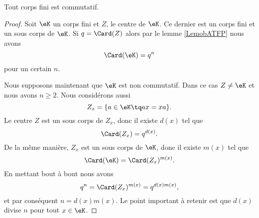 \begin{theorem}    \label{ThoMncIWA}
    Tout corps fini est commutatif.
\end{theorem}

\begin{proof}
    Soit \( \eK\) un corps fini et \( Z\), le centre de \( \eK\). Ce dernier est un corps fini et un sous corps de \( \eK\). Si \( q=\Card(Z)\) alors par le lemme \ref{LemobATFP} nous avons
    \begin{equation}
        \Card(\eK)=q^n
    \end{equation}
    pour un certain \( n\).

    Nous supposons maintenant que \( \eK\) est non commutatif. Dans ce cas \( Z\neq \eK\) et nous avons \( n\geq 2\). Nous considérons aussi
    \begin{equation}
        Z_x=\{ a\in \eK\tq ax=xa \}.
    \end{equation}
    Le centre \( Z\) est un sous corps de \( Z_x\), donc il existe \( d(x)\) tel  que
    \begin{equation}
        \Card(Z_x)=q^{d(x)}.
    \end{equation}
    De la même manière, \( Z_x\) est un sous corps de \( \eK\), donc il existe \( m(x)\) tel que
    \begin{equation}
        \Card(\eK)=\Card(Z_x)^{m(x)}.
    \end{equation}
    En mettant bout à bout nous avons
    \begin{equation}
        q^n=\Card(Z_x)^{m(x)}=q^{d(x)m(x)},
    \end{equation}
    et par conséquent \( n=d(x)m(x)\). Le point important à retenir est que \( d(x)\) divise \( n\) pour tout \( x\in \eK\).


\end{proof}
